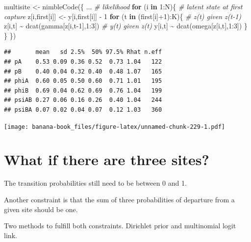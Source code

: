 \documentclass[
  12pt,
]{krantz}
\newenvironment{Shaded}{\begin{snugshade}}{\end{snugshade}}
\newcommand{\CommentTok}[1]{\textcolor[rgb]{0.56,0.35,0.01}{\textit{#1}}}
\newcommand{\ControlFlowTok}[1]{\textcolor[rgb]{0.13,0.29,0.53}{\textbf{#1}}}
\newcommand{\DecValTok}[1]{\textcolor[rgb]{0.00,0.00,0.81}{#1}}
\newcommand{\FunctionTok}[1]{\textcolor[rgb]{0.00,0.00,0.00}{#1}}
\newcommand{\NormalTok}[1]{#1}
\newcommand{\OtherTok}[1]{\textcolor[rgb]{0.56,0.35,0.01}{#1}}
\newcommand{\SpecialCharTok}[1]{\textcolor[rgb]{0.00,0.00,0.00}{#1}}
\begin{document}
\begin{Shaded}
\begin{Highlighting}[]
\NormalTok{multisite }\OtherTok{\textless{}{-}} \FunctionTok{nimbleCode}\NormalTok{(\{}
\NormalTok{...}
  \CommentTok{\# likelihood}
  \ControlFlowTok{for}\NormalTok{ (i }\ControlFlowTok{in} \DecValTok{1}\SpecialCharTok{:}\NormalTok{N)\{}
    \CommentTok{\# latent state at first capture}
\NormalTok{    z[i,first[i]] }\OtherTok{\textless{}{-}}\NormalTok{ y[i,first[i]] }\SpecialCharTok{{-}} \DecValTok{1}
    \ControlFlowTok{for}\NormalTok{ (t }\ControlFlowTok{in}\NormalTok{ (first[i]}\SpecialCharTok{+}\DecValTok{1}\NormalTok{)}\SpecialCharTok{:}\NormalTok{K)\{}
      \CommentTok{\# z(t) given z(t{-}1)}
\NormalTok{      z[i,t] }\SpecialCharTok{\textasciitilde{}} \FunctionTok{dcat}\NormalTok{(gamma[z[i,t}\DecValTok{{-}1}\NormalTok{],}\DecValTok{1}\SpecialCharTok{:}\DecValTok{3}\NormalTok{])}
      \CommentTok{\# y(t) given z(t)}
\NormalTok{      y[i,t] }\SpecialCharTok{\textasciitilde{}} \FunctionTok{dcat}\NormalTok{(omega[z[i,t],}\DecValTok{1}\SpecialCharTok{:}\DecValTok{3}\NormalTok{])}
\NormalTok{    \}}
\NormalTok{  \}}
\NormalTok{\})}
\end{Highlighting}
\end{Shaded}

\begin{verbatim}
##       mean   sd 2.5%  50% 97.5% Rhat n.eff
## pA    0.53 0.09 0.36 0.52  0.73 1.04   122
## pB    0.40 0.04 0.32 0.40  0.48 1.07   165
## phiA  0.60 0.05 0.50 0.60  0.71 1.01   195
## phiB  0.69 0.04 0.62 0.69  0.76 1.04   199
## psiAB 0.27 0.06 0.16 0.26  0.40 1.04   244
## psiBA 0.07 0.02 0.04 0.07  0.12 1.03   360
\end{verbatim}

\texttt{[image: banana-book\_files/figure-latex/unnamed-chunk-229-1.pdf]}

\hypertarget{what-if-there-are-three-sites}{%
\section{What if there are three sites?}\label{what-if-there-are-three-sites}}

The transition probabilities still need to be between 0 and 1.

Another constraint is that the sum of three probabilities of departure from a given site should be one.

Two methods to fulfill both constraints. Dirichlet prior and multinomial logit link.
\end{document}
